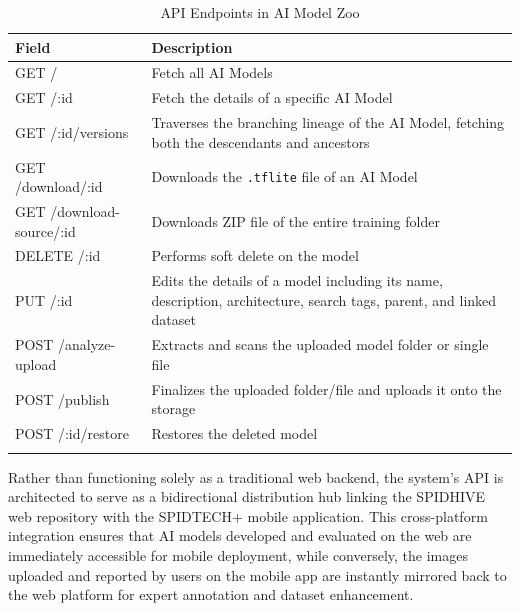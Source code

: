 \documentclass[journal]{./IEEE/IEEEtran}
\begin{document}
\begin{table}[htbp]
    \centering
    \caption{API Endpoints in AI Model Zoo}
    \label{tab:api_endpoints}
    \begin{tabular}{p{}p{}}
        \toprule
        \textbf{Field}      & \textbf{Description} \\ 
        \midrule
        GET /                       & Fetch all AI Models\\ 
        GET /:id                    & Fetch the details of a specific AI Model\\ 
        GET /:id/versions           & Traverses the branching lineage of the AI Model, fetching both the descendants and ancestors\\ 
        GET /download/:id           & Downloads the \texttt{.tflite} file of an AI Model\\ 
        GET /download-source/:id    & Downloads ZIP file of the entire training folder\\ 
        DELETE /:id                 & Performs soft delete on the model\\ 
        PUT /:id                    & Edits the details of a model including its name, description, architecture, search tags, parent, and linked dataset\\
        POST /analyze-upload        & Extracts and scans the uploaded model folder or single file\\
        POST /publish               & Finalizes the uploaded folder/file and uploads it onto the storage\\
        POST /:id/restore           & Restores the deleted model\\
        \bottomrule
 &\\
    \end{tabular}
\end{table}

Rather than functioning solely as a traditional web backend, the system's API is architected to serve as a bidirectional distribution hub linking the SPIDHIVE web repository with the SPIDTECH+ mobile application. This cross-platform integration ensures that AI models developed and evaluated on the web are immediately accessible for mobile deployment, while conversely, the images uploaded and reported by users on the mobile app are instantly mirrored back to the web platform for expert annotation and dataset enhancement.
\end{document}
